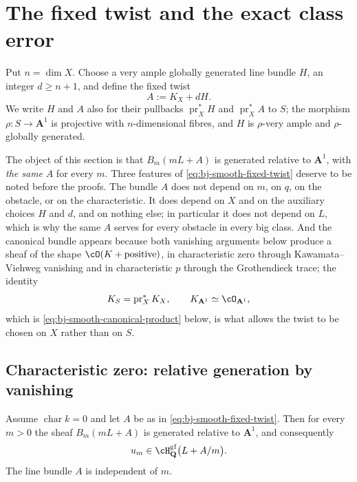 \section{The fixed twist and the exact class error}
\label{sec:ch40-stages}

Put $n=\dim X$.  Choose a very ample globally generated line bundle
$H$, an integer $d\ge n+1$, and define the fixed twist
\[
                              A:=K_X+dH.
\tag{40.12}\label{eq:bj-smooth-fixed-twist}
\]
We write $H$ and $A$ also for their pullbacks
$\operatorname{pr}_X^*H$ and $\operatorname{pr}_X^*A$ to $S$; the
morphism $\rho:S\to\mathbf A^1$ is projective with $n$-dimensional
fibres, and $H$ is $\rho$-very ample and $\rho$-globally generated.

The object of this section is that $B_m(mL+A)$ is generated relative to
$\mathbf A^1$, with \emph{the same} $A$ for every $m$.  Three features
of \eqref{eq:bj-smooth-fixed-twist} deserve to be noted before the proofs.
The bundle $A$ does not depend on $m$, on $q$, on the obstacle, or on
the characteristic.  It does depend on $X$ and on the auxiliary choices
$H$ and $d$, and on nothing else; in particular it does not depend on
$L$, which is why the same $A$ serves for every obstacle in every big
class.  And the canonical bundle appears because both vanishing arguments
below produce a sheaf of the shape $\cO(K+\text{positive})$, in
characteristic zero through Kawamata--Viehweg vanishing and in
characteristic $p$ through the Grothendieck trace; the identity
\[
 K_S=\operatorname{pr}_X^*K_X,
 \qquad
 K_{\mathbf A^1}\simeq\cO_{\mathbf A^1},
\]
which is \eqref{eq:bj-smooth-canonical-product} below, is what allows the
twist to be chosen on $X$ rather than on $S$.

\subsection{Characteristic zero: relative generation by vanishing}
\label{sec:ch40-generation-char-zero}

\begin{proposition}
\label{prop:ch40-multiplier-uniform-generation}
Assume $\operatorname{char}k=0$ and let $A$ be as in
\eqref{eq:bj-smooth-fixed-twist}.  Then for every $m>0$ the sheaf
$B_m(mL+A)$ is generated relative to $\mathbf A^1$, and consequently
\[
 u_m\in\cH^{\mathrm{gf}}_{\mathbf Q}\bigl(L+A/m\bigr).
\]
The line bundle $A$ is independent of $m$.
\end{proposition}

